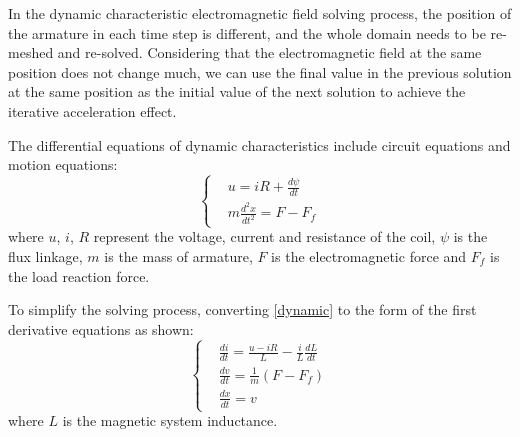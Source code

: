\documentclass[journal,transmag]{IEEEtran}
\begin{document}
In the dynamic characteristic electromagnetic field solving process, the position of the armature in each time step is different, and the whole domain needs to be re-meshed and re-solved. Considering that the electromagnetic field at the same position does not change much, we can use the final value in the previous solution at the same position as the initial value of the next solution to achieve the iterative acceleration effect.

The differential equations of dynamic characteristics include circuit equations and motion equations:
\begin{equation}
\left\{ 
\begin{aligned}
&u = iR + \frac{{d\psi }}{{dt}}\\
&m\frac{{{d^2}x}}{{d{t^2}}} = F - {F_f}
\end{aligned} 
\right.
\label{dynamic}
\end{equation}
where $u$, $i$, $R$ represent the voltage, current and resistance of the coil, $\psi$ is the flux linkage, $m$ is the mass of armature, $F$ is the electromagnetic force and $F_f$ is the load reaction force.

To simplify the solving process, converting \eqref{dynamic} to the form of the first derivative equations as shown:
\begin{equation}
\left\{
\begin{aligned}
&\frac{{di}}{{dt}} = \frac{{u - iR}}{L} - \frac{i}{L}\frac{{dL}}{{dt}}\\
&\frac{{dv}}{{dt}} = \frac{1}{m}(F - {F_f})\\
&\frac{{dx}}{{dt}} = v
\end{aligned}
\right.
\label{equ:dif}
\end{equation}
where $L$ is the magnetic system inductance.
\end{document}
